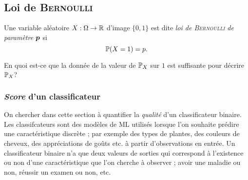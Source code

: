 \documentclass[11pt, a4paper]{article}
\begin{document}
\subsection{Loi de \textsc{Bernoulli}}
\label{sec:loibernoulli}

Une variable aléatoire $X : \Omega \to \mathbb{R}$ d'image
$\{0 , 1\}$ est dite \emph{loi de \textsc{Bernoulli} de paramètre
  $\boldsymbol{p}$} si
\[
  \operatorname{\mathbb{P}}(X = 1) = p.
\]
\begin{question}
  En quoi est-ce que la donnée de la valeur de $\operatorname{\mathbb{P}}_X$ sur $1$ est
  suffisante pour décrire $\operatorname{\mathbb{P}}_X$?
\end{question}

\subsubsection{\emph{Score} d'un classificateur}
\label{sec:classificateurAlea}

On chercher dans cette section à quantifier la \textit{qualité} d'un
classificateur binaire. Les classifcateurs sont des modèles de ML
utilisés lorsque l'on souhaite prédire une caractéristique discrète ;
par exemple des types de plantes, des couleurs de cheveux, des
appréciations de goûts etc. à partir d'observations en entrée. Un
classificateur binaire n'a que deux valeurs de sorties qui correspond
à l'existence ou non d'une caractéristique que l'on cherche à observer
; avoir une maladie ou non, réussir un examen ou non, etc.
\end{document}
